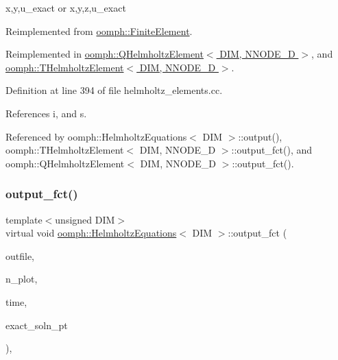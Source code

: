 x,y,u\+\_\+exact or x,y,z,u\+\_\+exact 

Reimplemented from \hyperlink{classoomph_1_1FiniteElement_a22b695c714f60ee6cd145be348042035}{oomph\+::\+Finite\+Element}.



Reimplemented in \hyperlink{classoomph_1_1QHelmholtzElement_ae560b649d5604bfa9a49e0cd7fb37d6f}{oomph\+::\+Q\+Helmholtz\+Element$<$ D\+I\+M, N\+N\+O\+D\+E\+\_\+D $>$}, and \hyperlink{classoomph_1_1THelmholtzElement_a38d31ed7eae928a91af0bf96e57f366a}{oomph\+::\+T\+Helmholtz\+Element$<$ D\+I\+M, N\+N\+O\+D\+E\+\_\+D $>$}.



Definition at line 394 of file helmholtz\+\_\+elements.\+cc.



References i, and s.



Referenced by oomph\+::\+Helmholtz\+Equations$<$ D\+I\+M $>$\+::output(), oomph\+::\+T\+Helmholtz\+Element$<$ D\+I\+M, N\+N\+O\+D\+E\+\_\+D $>$\+::output\+\_\+fct(), and oomph\+::\+Q\+Helmholtz\+Element$<$ D\+I\+M, N\+N\+O\+D\+E\+\_\+D $>$\+::output\+\_\+fct().

\mbox{\label{classoomph_1_1HelmholtzEquations_abf09295bc42ac5e63b83b3162b94c949}} 
\subsubsection{\texorpdfstring{output\+\_\+fct()}{output\_fct()}\hspace{0.1cm}{\footnotesize\ttfamily [2/2]}}
{\footnotesize\ttfamily template$<$unsigned D\+IM$>$ \\
virtual void \hyperlink{classoomph_1_1HelmholtzEquations}{oomph\+::\+Helmholtz\+Equations}$<$ D\+IM $>$\+::output\+\_\+fct (\begin{DoxyParamCaption}\item[{std\+::ostream \&}]{outfile,  }\item[{const unsigned \&}]{n\+\_\+plot,  }\item[{const double \&}]{time,  }\item[{\hyperlink{classoomph_1_1FiniteElement_ad4ecf2b61b158a4b4d351a60d23c633e}{Finite\+Element\+::\+Unsteady\+Exact\+Solution\+Fct\+Pt}}]{exact\+\_\+soln\+\_\+pt }\end{DoxyParamCaption})\hspace{0.3cm}{\ttfamily [inline]}, {\ttfamily [virtual]}}



